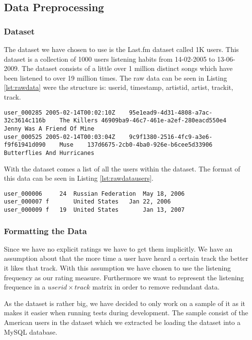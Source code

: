 \subsection{Data Preprocessing}
\subsubsection{Dataset}
The dataset we have chosen to use is the Last.fm\cite{lastfm} dataset called 1K users\parencite{lastfmdataset}. This dataset is a collection of 1000 users listening habits from 14-02-2005 to 13-06-2009. The dataset consists of a little over 1 million distinct songs which have been listened to over 19 million times. The raw data can be seen in Listing \ref{lst:rawdata} were the structure is: userid, timestamp, artistid, artist, trackit, track.

\begin{lstlisting}[caption={An example of the raw data from the 1K dataset},label=lst:rawdata]	
user_000285	2005-02-14T00:02:10Z	95e1ead9-4d31-4808-a7ac-32c3614c116b	The Killers	46909ba9-46c7-461e-a2ef-280eacd550e4	Jenny Was A Friend Of Mine
user_000525	2005-02-14T00:03:04Z	9c9f1380-2516-4fc9-a3e6-f9f61941d090	Muse	137d6675-2cb0-4ba0-926e-b6cee5d33906	Butterflies And Hurricanes
\end{lstlisting}

With the dataset comes a list of all the users within the dataset. The format of this data can be seen in Listing \ref{lst:rawdatausers}.

 \begin{lstlisting}[caption={An example of the representation of users in the dataset},label=lst:rawdatausers]	
user_000006		24	Russian Federation	May 18, 2006
user_000007	f	  	United States	Jan 22, 2006
user_000009	f	19	United States		Jan 13, 2007
\end{lstlisting}

\subsubsection{Formatting the Data}
Since we have no explicit ratings we have to get them implicitly. We have an assumption about that the more time a user have heard a certain track the better it likes that track. With this assumption we have chosen to use the listening frequency as our rating measure. Furthermore we want to represent the listening frequence in a $userid \times track$ matrix in order to remove redundant data. 

As the dataset is rather big, we have decided to only work on a sample of it as it makes it easier when running tests during development. The sample consist of the American users in the dataset which we extracted be loading the dataset into a MySQL database. 


